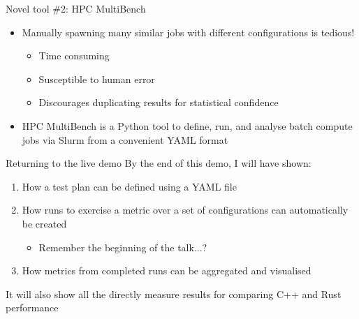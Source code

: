 \documentclass[10pt,aspectratio=169]{beamer}
\begin{document}
\begin{frame}{Novel tool \#2: HPC MultiBench}
    \begin{itemize}
        \item<1-> Manually spawning many similar jobs with different configurations is tedious!
        \begin{itemize}
            \item Time consuming
            \item Susceptible to human error
            \item Discourages duplicating results for statistical confidence
        \end{itemize}
        \vspace{0.5cm}
        \item<2-> HPC MultiBench is a Python tool to define, run, and analyse batch compute jobs via Slurm from a convenient YAML format
    \end{itemize}
\end{frame}

\begin{frame}{Returning to the live demo}
    By the end of this demo, I will have shown:
    \begin{enumerate}
        \item <1-> How a test plan can be defined using a YAML file
        \item <2-> How runs to exercise a metric over a set of configurations can automatically be created
        \begin{itemize}
            \item Remember the beginning of the talk...?
        \end{itemize}
        \item <3-> How metrics from completed runs can be aggregated and visualised
    \end{enumerate}
    \vspace*{0.5cm)}
    \alert{It will also show all the directly measure results for comparing C++ and Rust performance}
\end{frame}





\end{document}
